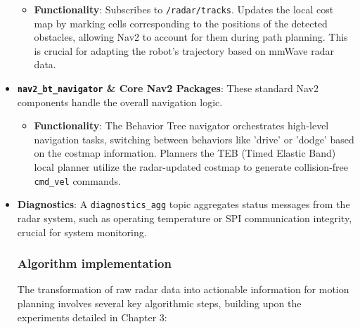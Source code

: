 \begin{itemize}
\begin{itemize}
        \item \textbf{Functionality}: Subscribes to \texttt{/radar/tracks}. Updates the local cost map by marking cells corresponding to the positions of the detected obstacles, allowing Nav2 to account for them during path planning. This is crucial for adapting the robot's trajectory based on mmWave radar data.
    \end{itemize}
    \item \textbf{\texttt{nav2\_bt\_navigator} \& Core Nav2 Packages}: These standard Nav2 components handle the overall navigation logic.
    \begin{itemize}
        \item \textbf{Functionality}: The Behavior Tree navigator orchestrates high-level navigation tasks, switching between behaviors like 'drive' or 'dodge' based on the costmap information. Planners the TEB (Timed Elastic Band) local planner utilize the radar-updated costmap to generate collision-free \texttt{cmd\_vel} commands.
    \end{itemize}
    \item \textbf{Diagnostics}: A \texttt{diagnostics\_agg} topic aggregates status messages from the radar system, such as operating temperature or SPI communication integrity, crucial for system monitoring.
    

\subsubsection{Algorithm implementation}

The transformation of raw radar data into actionable information for motion planning involves several key algorithmic steps, building upon the experiments detailed in Chapter 3:


\end{itemize}
